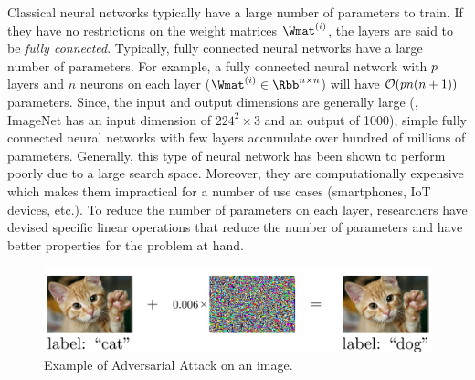 Classical neural networks typically have a large number of parameters to train.
If they have no restrictions on the weight matrices $\Wmat^{(i)}$, the layers are said to be \emph{fully connected}.
Typically, fully connected neural networks have a large number of parameters.
For example, a fully connected neural network with $p$ layers and $n$ neurons on each layer ($\Wmat^{(i)} \in \Rbb^{n \times n}$) will have $\bigO\left(pn (n + 1)\right)$ parameters.
Since, the input and output dimensions are generally large (\eg, ImageNet has an input dimension of $224^2 \times 3$ and an output of 1000), simple fully connected neural networks with few layers accumulate over hundred of millions of parameters.
Generally, this type of neural network has been shown to perform poorly due to a large search space.
Moreover, they are computationally expensive which makes them impractical for a number of use cases (smartphones, IoT devices, etc.).
To reduce the number of parameters on each layer, researchers have devised specific linear operations that reduce the number of parameters and have better properties for the problem at hand.


\begin{figure}[t]
  \centering
  \includegraphics[width=\textwidth]{figures/main/ch1-introduction/ExampleAdversarialCatDog.pdf}
  \caption{Example of Adversarial Attack on an image.}
  \label{figure:ch1-adversarial_image_example}
\end{figure}

